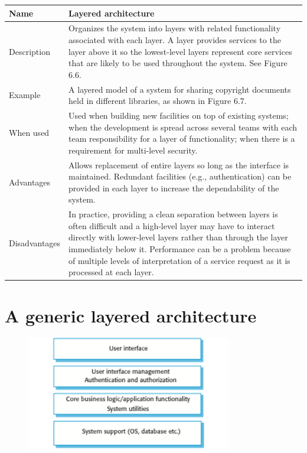 \begin{table}[h!]
\centering
\begin{tabular}{ |p{3cm}|p{8cm}|  }
\hline
Name & Layered architecture\\
\hline
\hline
Description & Organizes the system into layers with related functionality associated with each layer. A layer provides services to the layer above it so the lowest-level layers represent core services that are likely to be used throughout the system. See Figure 6.6.\\
\hline
Example & A layered model of a system for sharing copyright documents held in different libraries, as shown in Figure 6.7.\\
\hline
When used & Used when building new facilities on top of existing systems; when the development is spread across several teams with each team responsibility for a layer of functionality; when there is a requirement for multi-level security.\\
\hline
Advantages & Allows replacement of entire layers so long as the interface is maintained. Redundant facilities (e.g., authentication) can be provided in each layer to increase the dependability of the system.\\
\hline
Disadvantages & In practice, providing a clean separation between layers is often difficult and a high-level layer may have to interact directly with lower-level layers rather than through the layer immediately below it. Performance can be a problem because of multiple levels of interpretation of a service request as it is processed at each layer.\\
\hline
\end{tabular}

\label{table:T2_3}
\end{table}

\newpage
\section{A generic layered architecture}
\begin{figure}[h!]
    \centering
    \includegraphics[width = 0.8\textwidth]{./figures/L3_4.png}
    \caption{}
    \label{fig:L3_4}
\end{figure}

